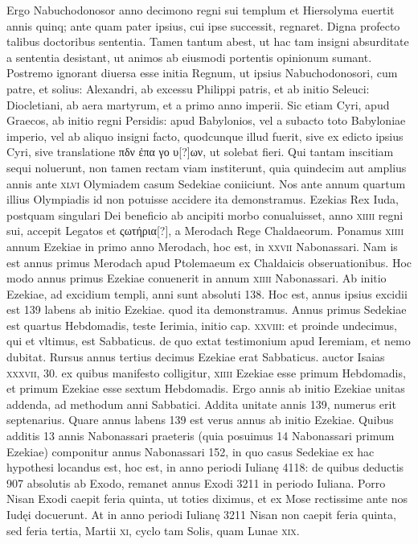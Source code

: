 \begin{parnumbers}
{}
Ergo Nabuchodonosor anno
decimono regni sui templum et Hiersolyma euertit annis quinq;
ante quam pater ipsius, cui ipse successit, regnaret.
\lnr{}Digna profecto
talibus doctoribus sententia.
\lnr{}Tamen tantum abest, ut hac tam insigni
absurditate a sententia desistant, ut animos ab eiusmodi portentis
opinionum sumant.
\lnr{}Postremo ignorant diuersa esse initia Regnum,
ut ipsius Nabuchodonosori, cum patre, et solius: Alexandri,
ab excessu Philippi patris, et ab initio Seleuci: Diocletiani, ab aera
martyrum, et a primo anno imperii.
\lnr{}Sic etiam Cyri, apud Graecos, ab
initio regni Persidis: apud Babylonios, vel a subacto toto Babyloniae
imperio, vel ab aliquo insigni facto, quodcunque illud fuerit, sive
ex edicto ipsius Cyri, sive translatione \textgreek{πδν ἐπα γο υ[?]ων},
ut solebat fieri.
\lnr{}Qui tantam inscitiam sequi noluerunt, non tamen rectam viam
institerunt, quia quindecim aut amplius annis ante \textsc{xlvi} Olymiadem
casum Sedekiae coniiciunt.
\lnr{}Nos ante annum quartum illius
Olympiadis id non potuisse accidere ita demonstramus. 
\lnr{}Ezekias
Rex Iuda, postquam singulari Dei beneficio ab ancipiti morbo conualuisset,
anno \textsc{xiiii} regni sui, accepit Legatos et \textgreek{ςωτήρια[?]}, a
Merodach Rege Chaldaeorum.
\lnr{}Ponamus \textsc{xiiii} annum Ezekiae in
primo anno Merodach, hoc est, in \textsc{xxvii} Nabonassari.
\lnr{}Nam is est
annus primus Merodach apud Ptolemaeum ex Chaldaicis obseruationibus. 
\lnr{}Hoc modo annus primus Ezekiae conuenerit in annum
\textsc{xiiii} Nabonassari. Ab initio Ezekiae, ad excidium templi, anni
sunt absoluti 138.
\lnr{}Hoc est, annus ipsius excidii est 139 labens ab initio
Ezekiae.
\lnr{}quod ita demonstramus. 
\lnr{}Annus primus Sedekiae est
quartus Hebdomadis, teste Ierimia, initio cap. \textsc{xxviii}: et proinde
undecimus, qui et vltimus, est Sabbaticus. 
\lnr{}de quo extat testimonium
apud Ieremiam, et nemo dubitat.
\lnr{}Rursus annus tertius decimus
Ezekiae erat Sabbaticus. 
\lnr{}auctor Isaias \textsc{xxxvii}, 30.
\lnr{}ex quibus
manifesto colligitur, \textsc{xiiii} Ezekiae esse primum Hebdomadis, et primum
Ezekiae esse sextum Hebdomadis. 
\lnr{}Ergo annis ab initio Ezekiae unitas addenda, ad methodum anni Sabbatici.
\lnr{}Addita unitate annis
139, numerus erit septenarius. 
\lnr{}Quare annus labens 139 est verus
annus ab initio Ezekiae.
\lnr{}Quibus additis 13 annis Nabonassari praeteris
(quia posuimus 14 Nabonassari primum Ezekiae) componitur
annus Nabonassari 152, in quo casus Sedekiae ex hac hypothesi
locandus est, hoc est, in anno periodi Iulianę 4118: de quibus deductis
907 absolutis ab Exodo, remanet annus Exodi 3211 in periodo Iuliana.
\lnr{}Porro Nisan Exodi caepit feria quinta, ut toties diximus, et ex
Mose rectissime ante nos Iudęi docuerunt.
\lnr{}At in anno periodi Iulianę
3211 Nisan non caepit feria quinta, sed feria tertia,
 Martii \textsc{xi}, cyclo tam
Solis, quam Lunae \textsc{xix}.


\end{parnumbers}
